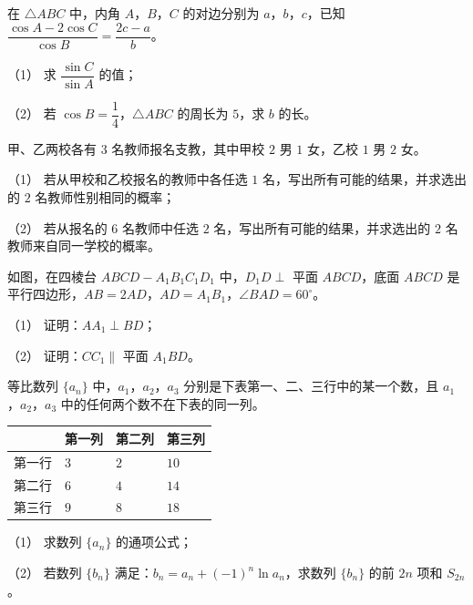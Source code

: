 \begin{question}
在 $\triangle ABC$ 中，内角 $A$，$B$，$C$ 的对边分别为 $a$，$b$，$c$，已知 $\dfrac{\cos A-2\cos C}{\cos B}=\dfrac{2c-a}{b}$。

（1） 求 $\dfrac{\sin C}{\sin A}$ 的值；

（2） 若 $\cos B=\dfrac14$，$\triangle ABC$ 的周长为 $5$，求 $b$ 的长。

\end{question}
\begin{question}
甲、乙两校各有 $3$ 名教师报名支教，其中甲校 $2$ 男 $1$ 女，乙校 $1$ 男 $2$ 女。

（1） 若从甲校和乙校报名的教师中各任选 $1$ 名，写出所有可能的结果，并求选出的 $2$ 名教师性别相同的概率；

（2） 若从报名的 $6$ 名教师中任选 $2$ 名，写出所有可能的结果，并求选出的 $2$ 名教师来自同一学校的概率。

\Needspace{0.4\textheight}
\end{question}
\begin{question}
如图，在四棱台 $ABCD-A_1B_1C_1D_1$ 中，$D_1D\perp$ 平面 $ABCD$，底面 $ABCD$ 是平行四边形，$AB=2AD$，$AD=A_1B_1$，$\angle BAD=60^\circ$。

（1） 证明：$AA_1\perp BD$；

（2） 证明：$CC_1\parallel$ 平面 $A_1BD$。
\nopagebreak[4]
\begin{center}\end{center}
\nopagebreak[4]
\end{question}
\begin{question}
等比数列 $\{a_n\}$ 中，$a_1$，$a_2$，$a_3$ 分别是下表第一、二、三行中的某一个数，且 $a_1$，$a_2$，$a_3$ 中的任何两个数不在下表的同一列。

\begin{center}
\begin{tabular}{llll}
\toprule
 & 第一列 & 第二列 & 第三列 \\
\midrule
第一行 & $3$ & $2$ & $10$ \\
第二行 & $6$ & $4$ & $14$ \\
第三行 & $9$ & $8$ & $18$ \\
\bottomrule
\end{tabular}
\end{center}

（1） 求数列 $\{a_n\}$ 的通项公式；

（2） 若数列 $\{b_n\}$ 满足：$b_n=a_n+(-1)^n\ln a_n$，求数列 $\{b_n\}$ 的前 $2n$ 项和 $S_{2n}$。

\Needspace{0.4\textheight}
\end{question}
